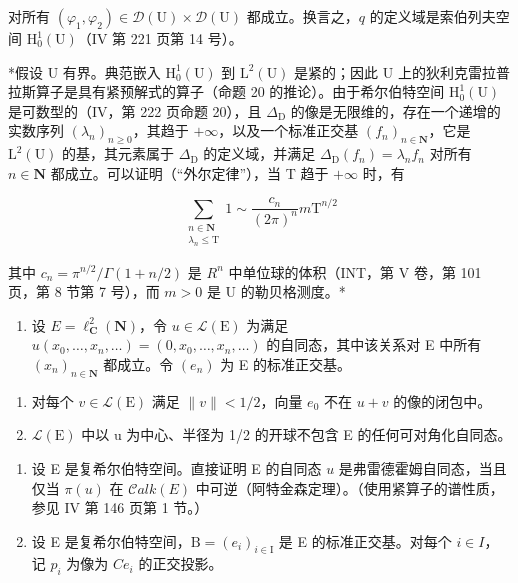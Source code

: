 对所有 \((\varphi_{1},\varphi_{2})\in\mathcal{D}(\mathrm{U})\times\mathcal{D}(\mathrm{U})\) 都成立。换言之，\(q\) 的定义域是索伯列夫空间 \(\mathrm{H}_{0}^{1}(\mathrm{U})\)（IV 第 221 页第 14 号）。

*假设 U 有界。典范嵌入 \(\mathrm{H}_0^1 (\mathrm{U})\) 到 \(\mathrm{L}^2 (\mathrm{U})\) 是紧的；因此 U 上的狄利克雷拉普拉斯算子是具有紧预解式的算子（命题 20 的推论）。由于希尔伯特空间 \(\mathrm{H}_0^1 (\mathrm{U})\) 是可数型的（IV，第 222 页命题 20），且 \(\Delta_{\mathrm{D}}\) 的像是无限维的，存在一个递增的实数序列 \((\lambda_n)_{n\geqslant 0}\)，其趋于 \(+\infty\)，以及一个标准正交基 \((f_n)_{n\in \mathbf{N}}\)，它是 \(\mathrm{L}^2 (\mathrm{U})\) 的基，其元素属于 \(\Delta_{\mathrm{D}}\) 的定义域，并满足 \(\Delta_{\mathrm{D}}(f_n) = \lambda_n f_n\) 对所有 \(n\in \mathbf{N}\) 都成立。可以证明（“外尔定律”），当 T 趋于 \(+\infty\) 时，有

\[
\sum_{\substack{n\in \mathbf{N}\\ \lambda_{n}\leqslant \mathrm{T}}}1\sim \frac{c_{n}}{(2\pi)^{n}} m\mathrm{T}^{n / 2}
\]

其中 \(c_{n} = \pi^{n/2}/\Gamma(1 + n/2)\) 是 \(R^{n}\) 中单位球的体积（INT，第 V 卷，第 101 页，第 8 节第 7 号），而 \(m > 0\) 是 U 的勒贝格测度。*


\exercisesection{}

\begin{enumerate}
\def\labelenumi{\arabic{enumi})}
\tightlist
\item
  设 \(E = \ell_{\mathbf{C}}^{2}(\mathbf{N})\)，令 \(u \in \mathcal{L}(\mathrm{E})\) 为满足 \(u(x_{0}, \ldots, x_{n}, \ldots) = (0, x_{0}, \ldots, x_{n}, \ldots)\) 的自同态，其中该关系对 E 中所有 \((x_{n})_{n \in \mathbf{N}}\) 都成立。令 \((e_{n})\) 为 E 的标准正交基。
\end{enumerate}

\begin{enumerate}
\def\labelenumi{\alph{enumi})}
\item
  对每个 \(v \in \mathcal{L}(\mathrm{E})\) 满足 \(\|v\| < 1/2\)，向量 \(e_{0}\) 不在 \(u + v\) 的像的闭包中。
\item
  \(\mathcal{L}(\mathrm{E})\) 中以 u 为中心、半径为 1/2 的开球不包含 E 的任何可对角化自同态。
\end{enumerate}

\begin{enumerate}
\def\labelenumi{\arabic{enumi})}
\setcounter{enumi}{1}
\item
  设 E 是复希尔伯特空间。直接证明 E 的自同态 \(u\) 是弗雷德霍姆自同态，当且仅当 \(\pi(u)\) 在 \(\mathcal{C}alk(E)\) 中可逆（阿特金森定理）。（使用紧算子的谱性质，参见 IV 第 146 页第 1 节。）
\item
  设 E 是复希尔伯特空间，\(\mathrm{B}=(e_{i})_{i\in\mathrm{I}}\) 是 E 的标准正交基。对每个 \(i\in I\)，记 \(p_{i}\) 为像为 \(Ce_{i}\) 的正交投影。
\end{enumerate}

